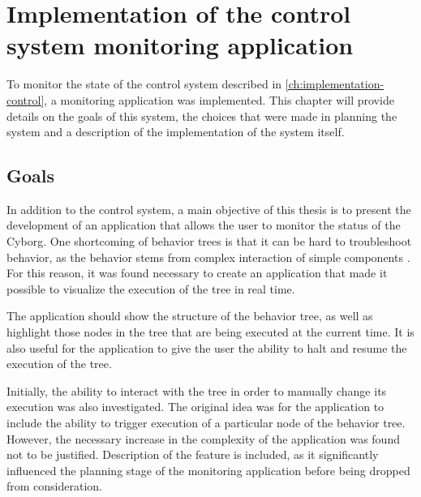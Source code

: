 \documentclass[\rootfolder/main.tex]{subfiles}
\begin{document}
\chapter{Implementation of the control system monitoring application} %
\label{ch:implementation-monitoring} %

To monitor the state of the control system described in \cref{ch:implementation-control}, a monitoring application was implemented.
This chapter will provide details on the goals of this system, the choices that were made in planning the system and a description of the implementation of the system itself.


\section{Goals}

In addition to the control system, a main objective of this thesis is to present the development of an application that allows the user to monitor the status of the Cyborg.
One shortcoming of behavior trees is that it can be hard to troubleshoot behavior, as the behavior stems from complex interaction of simple components \cite{Millington2009}.
For this reason, it was found necessary to create an application that made it possible to visualize the execution of the tree in real time.

The application should show the structure of the behavior tree, as well as highlight those nodes in the tree that are being executed at the current time.
It is also useful for the application to give the user the ability to halt and resume the execution of the tree.

Initially, the ability to interact with the tree in order to manually change its execution was also investigated.
The original idea was for the application to include the ability to trigger execution of a particular node of the behavior tree.
However, the necessary increase in the complexity of the application was found not to be justified.
Description of the feature is included, as it significantly influenced the planning stage of the monitoring application before being dropped from consideration.
\end{document}
